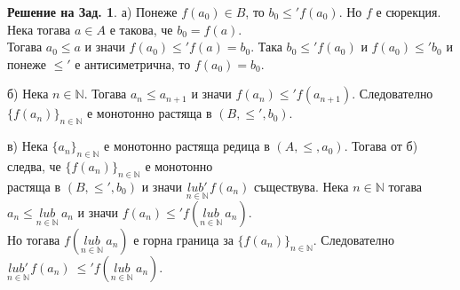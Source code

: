 \documentclass[a4paper,9pt]{extarticle}
\theoremstyle{definition}
\newtheorem{solution}{Решение на Зад.}
\newcommand{\Nat}{\mathbb{N}}
\begin{document}
\begin{solution}
а) Понеже \(f(a_0) \in B\), то \(b_0 \leqslant' f(a_0)\).
Но \(f\) е сюрекция. Нека тогава \(a \in A\) е такова, че \(b_0 = f(a)\). \\
Тогава \(a_0 \leqslant a\) и значи \(f(a_0) \leqslant' f(a) = b_0\).
Така \(b_0 \leqslant' f(a_0)\) и \(f(a_0) \leqslant' b_0\) и понеже $\leqslant'$ е антисиметрична, то \(f(a_0) = b_0\).

\vskip7pt 

б) Нека \(n \in \Nat\). Тогава \(a_n \leqslant a_{n + 1}\) и значи \(f(a_n) \leqslant' f(a_{n + 1})\).
Следователно \(\{f(a_n)\}_{n \in \Nat}\) е монотонно растяща в $(B, \leqslant', b_0)$.

\vskip7pt 

в) Нека $\{a_n\}_{n \in \Nat}$ е монотонно растяща редица в $(A, \leqslant, a_0)$.
Тогава от б) следва, че \(\{f(a_n)\}_{n \in \Nat}\) е монотонно \\
растяща в $(B, \leqslant', b_0)$ и значи $\underset{n \in \Nat}{lub'}\hspace{1pt} f(a_n)$ съществува.
Нека $n \in \Nat$ тогава $a_n \leqslant \underset{n \in \Nat}{lub}\ a_n$ и значи
$f(a_n) \leqslant' f\left(\underset{n \in \Nat}{lub}\ a_n\right)$. \\
Но тогава $f\left(\underset{n \in \Nat}{lub}\ a_n\right)$ е горна граница за $\{f(a_n)\}_{n \in \Nat}$.
Следователно $\underset{n \in \Nat}{lub'}\hspace{1pt} f(a_n)\ \leqslant'f( \underset{n \in \Nat}{lub}\ a_n)$.

\vskip7pt


\end{solution}
\end{document}
